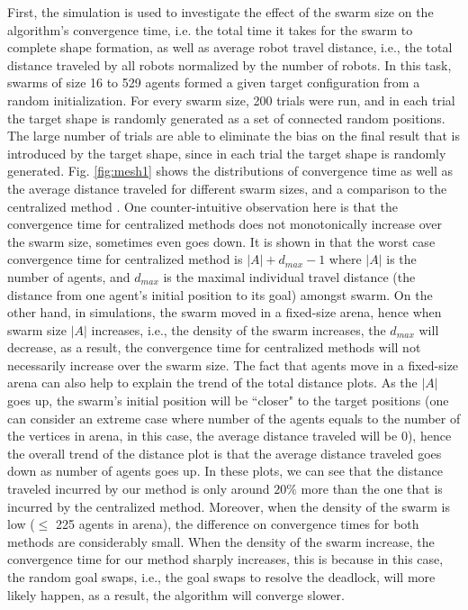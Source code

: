 \documentclass[journal]{IEEEtran}
\begin{document}
First, the simulation is used to investigate the effect of the swarm size on the algorithm's convergence time, i.e. the total time it takes for the swarm to complete shape formation, as well as average robot travel distance, i.e., the total distance traveled by all robots normalized by the number of robots. In this task, swarms of size 16 to 529 agents formed a given target configuration from a random initialization. For every swarm size, 200 trials were run, and in each trial the target shape is randomly generated as a set of connected random positions. The large number of trials are able to eliminate the bias on the final result that is introduced by the target shape, since in each trial the target shape is randomly generated. Fig. \ref{fig:mesh1} shows the distributions of convergence time as well as the average distance traveled for different swarm sizes, and a comparison to the centralized method  \cite{centralized}. One counter-intuitive observation here is that the convergence time for centralized methods does not monotonically increase over the swarm size, sometimes even goes down. It is shown in \cite{centralized} that the worst case convergence time for centralized method is $|A|+d_{max}-1$ where $|A|$ is the number of agents, and $d_{max}$ is the maximal individual travel distance (the distance from one agent's initial position to its goal) amongst swarm. On the other hand, in simulations, the swarm moved in a fixed-size arena, hence when swarm size $|A|$ increases, i.e., the density of the swarm increases, the $d_{max}$ will decrease, as a result, the convergence time for centralized methods will not necessarily increase over the swarm size. The fact that agents move in a fixed-size arena can also help to explain the trend of the total distance plots. As the $|A|$ goes up, the swarm's initial position will be ``closer" to the target positions (one can consider an extreme case where number of the agents equals to the number of the vertices in arena, in this case, the average distance traveled will be 0), hence the overall trend of the distance plot is that the average distance traveled goes down as number of agents goes up. In these plots, we can see that the distance traveled incurred by our method is only around $20\%$ more than the one that is incurred by the centralized method. Moreover, when the density of the swarm is low ($\leq$ 225 agents in arena), the difference on convergence times for both methods are considerably small. When the density of the swarm increase, the convergence time for our method sharply increases, this is because in this case, the random goal swaps, i.e., the goal swaps to resolve the deadlock, will more likely happen, as a result, the algorithm will converge slower.  
\end{document}
